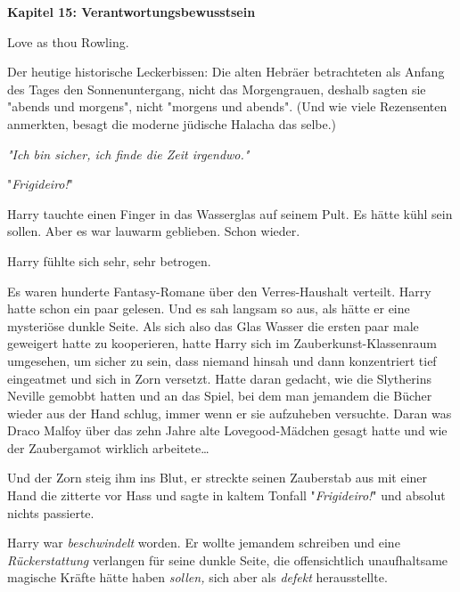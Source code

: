 

\hypertarget{verantwortungsbewusstsein}{%

\textbf{Kapitel 15: Verantwortungsbewusstsein}

Love as thou Rowling.

Der heutige historische Leckerbissen: Die alten Hebräer betrachteten als Anfang des Tages den Sonnenuntergang, nicht das Morgengrauen, deshalb sagten sie "abends und morgens", nicht "morgens und abends". (Und wie viele Rezensenten anmerkten, besagt die moderne jüdische Halacha das selbe.)

\later

\emph{"Ich bin sicher, ich finde die Zeit irgendwo."}

\later

"\emph{Frigideiro!}"

Harry tauchte einen Finger in das Wasserglas auf seinem Pult. Es hätte kühl sein sollen. Aber es war lauwarm geblieben. Schon wieder.

Harry fühlte sich sehr, sehr betrogen.

Es waren hunderte Fantasy-Romane über den Verres-Haushalt verteilt. Harry hatte schon ein paar gelesen. Und es sah langsam so aus, als hätte er eine mysteriöse dunkle Seite. Als sich also das Glas Wasser die ersten paar male geweigert hatte zu kooperieren, hatte Harry sich im Zauberkunst-Klassenraum umgesehen, um sicher zu sein, dass niemand hinsah und dann konzentriert tief eingeatmet und sich in Zorn versetzt. Hatte daran gedacht, wie die Slytherins Neville gemobbt hatten und an das Spiel, bei dem man jemandem die Bücher wieder aus der Hand schlug, immer wenn er sie aufzuheben versuchte. Daran was Draco Malfoy über das zehn Jahre alte Lovegood-Mädchen gesagt hatte und wie der Zaubergamot wirklich arbeitete…

Und der Zorn steig ihm ins Blut, er streckte seinen Zauberstab aus mit einer Hand die zitterte vor Hass und sagte in kaltem Tonfall "\emph{Frigideiro!}" und absolut nichts passierte.

Harry war \emph{beschwindelt} worden. Er wollte jemandem schreiben und eine \emph{Rückerstattung} verlangen für seine dunkle Seite, die offensichtlich unaufhaltsame magische Kräfte hätte haben \emph{sollen,} sich aber als \emph{defekt} herausstellte.

}
